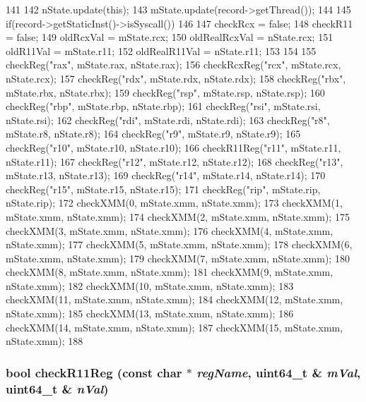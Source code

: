 \begin{DoxyCode}
141 {
142     nState.update(this);
143     mState.update(record->getThread());
144 
145     if(record->getStaticInst()->isSyscall())
146     {
147         checkRcx = false;
148         checkR11 = false;
149         oldRcxVal = mState.rcx;
150         oldRealRcxVal = nState.rcx;
151         oldR11Val = mState.r11;
152         oldRealR11Val = nState.r11;
153     }
154 
155     checkReg("rax", mState.rax, nState.rax);
156     checkRcxReg("rcx", mState.rcx, nState.rcx);
157     checkReg("rdx", mState.rdx, nState.rdx);
158     checkReg("rbx", mState.rbx, nState.rbx);
159     checkReg("rsp", mState.rsp, nState.rsp);
160     checkReg("rbp", mState.rbp, nState.rbp);
161     checkReg("rsi", mState.rsi, nState.rsi);
162     checkReg("rdi", mState.rdi, nState.rdi);
163     checkReg("r8",  mState.r8,  nState.r8);
164     checkReg("r9",  mState.r9,  nState.r9);
165     checkReg("r10", mState.r10, nState.r10);
166     checkR11Reg("r11", mState.r11, nState.r11);
167     checkReg("r12", mState.r12, nState.r12);
168     checkReg("r13", mState.r13, nState.r13);
169     checkReg("r14", mState.r14, nState.r14);
170     checkReg("r15", mState.r15, nState.r15);
171     checkReg("rip", mState.rip, nState.rip);
172     checkXMM(0, mState.xmm, nState.xmm);
173     checkXMM(1, mState.xmm, nState.xmm);
174     checkXMM(2, mState.xmm, nState.xmm);
175     checkXMM(3, mState.xmm, nState.xmm);
176     checkXMM(4, mState.xmm, nState.xmm);
177     checkXMM(5, mState.xmm, nState.xmm);
178     checkXMM(6, mState.xmm, nState.xmm);
179     checkXMM(7, mState.xmm, nState.xmm);
180     checkXMM(8, mState.xmm, nState.xmm);
181     checkXMM(9, mState.xmm, nState.xmm);
182     checkXMM(10, mState.xmm, nState.xmm);
183     checkXMM(11, mState.xmm, nState.xmm);
184     checkXMM(12, mState.xmm, nState.xmm);
185     checkXMM(13, mState.xmm, nState.xmm);
186     checkXMM(14, mState.xmm, nState.xmm);
187     checkXMM(15, mState.xmm, nState.xmm);
188 }
\end{DoxyCode}
\hypertarget{classTrace_1_1X86NativeTrace_a71ac25d49cd03430b8d3b773ed04ddbc}{
\subsubsection[{checkR11Reg}]{\setlength{\rightskip}{0pt plus 5cm}bool checkR11Reg (const char $\ast$ {\em regName}, \/  uint64\_\-t \& {\em mVal}, \/  uint64\_\-t \& {\em nVal})}}
\label{classTrace_1_1X86NativeTrace_a71ac25d49cd03430b8d3b773ed04ddbc}



